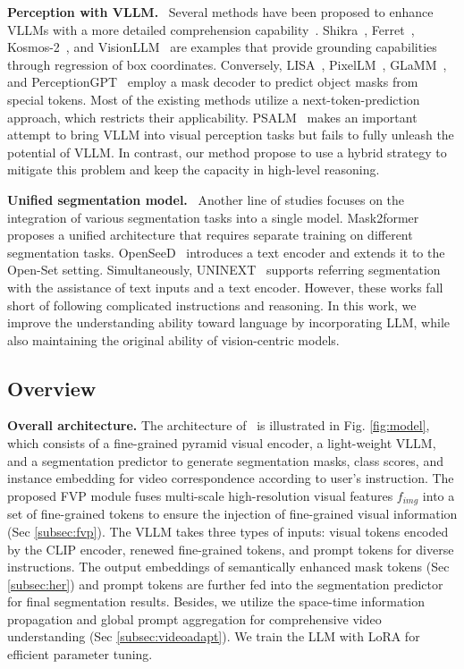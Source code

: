 \noindent \textbf{Perception with VLLM.}~
Several methods have been proposed to enhance VLLMs with a more detailed comprehension capability~\cite{chen2023shikra,wang2024visionllm,peng2023kosmos,you2023ferret,Lai2023LISARS,Ren2023PixelLMPR,rasheed2023glamm,pi2023perceptiongpt}.
Shikra~\cite{chen2023shikra}, Ferret~\cite{you2023ferret}, Kosmos-2~\cite{peng2023kosmos}, and VisionLLM~\cite{wang2024visionllm} are examples that provide grounding capabilities through regression of box coordinates. Conversely, LISA~\cite{Lai2023LISARS}, PixelLM~\cite{Ren2023PixelLMPR}, GLaMM~\cite{rasheed2023glamm}, and PerceptionGPT~\cite{pi2023perceptiongpt} employ a mask decoder to predict object masks from special tokens. 
Most of the existing methods utilize a next-token-prediction approach, which restricts their applicability. PSALM~\cite{zhang2024psalm} makes an important attempt to bring VLLM into visual perception tasks but fails to fully unleash the potential of VLLM. In contrast, our method propose to use a hybrid strategy to mitigate this problem and keep the capacity in high-level reasoning.

\noindent \textbf{Unified segmentation model.}~
Another line of studies focuses on the integration of various segmentation tasks into a single model. Mask2former~\cite{cheng2022masked} proposes a unified architecture that requires separate training on different segmentation tasks. 
OpenSeeD~\cite{zhang2023simple} introduces a text encoder and extends it to the Open-Set setting. Simultaneously, UNINEXT~\cite{lin2023uninext} supports referring segmentation with the assistance of text inputs and a text encoder. 
However, these works fall short of following complicated instructions and reasoning. In this work, we improve the understanding ability toward language by incorporating LLM, while also maintaining the original ability of vision-centric models. 

\subsection{Overview}
\label{subsec:overview}

\textbf{Overall architecture.} The architecture of \name~is illustrated in Fig. \ref{fig:model}, which consists of a fine-grained pyramid visual encoder, a light-weight VLLM, and a segmentation predictor to generate segmentation masks, class scores, and instance embedding for video correspondence according to user’s instruction.
The proposed FVP module fuses multi-scale high-resolution visual features $f_{img}$ into a set of fine-grained tokens to ensure the injection of fine-grained visual information (Sec \ref{subsec:fvp}).
The VLLM takes three types of inputs: visual tokens encoded by the CLIP encoder, renewed fine-grained tokens, and prompt tokens for diverse instructions. The output embeddings of semantically enhanced mask tokens (Sec \ref{subsec:her}) and prompt tokens are further fed into the segmentation predictor for final segmentation results. Besides, we utilize the space-time information propagation and global prompt aggregation for comprehensive video understanding (Sec \ref{subsec:videoadapt}).
We train the LLM with LoRA for efficient parameter tuning.

